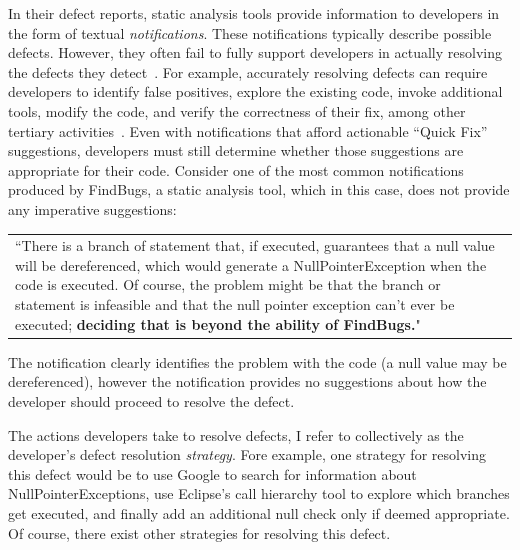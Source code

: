 \documentclass{sig-alternate}
\begin{document}
In their defect reports, static analysis tools provide information to developers in the form of textual \textit{notifications}.
These notifications typically describe possible defects.
However, they often fail to fully support developers in actually resolving the defects they detect~\cite{Johnson2013}.
For example, accurately resolving defects can require developers to identify false positives, explore the existing code, invoke additional tools, modify the code, and verify the correctness of their fix, among other tertiary activities~\cite{Smith2015}.  
Even with notifications that afford actionable ``Quick Fix'' suggestions, developers must still determine whether those suggestions are appropriate for their code.
Consider one of the most common \cite{Ayewah2007} notifications produced by FindBugs, a static analysis tool, which in this case, does not provide any imperative suggestions:


\vspace{2mm}

\begin{tabular}{|p{7.5cm}}
	``There is a branch of statement that, if executed, guarantees that a null value will be dereferenced, which would generate a NullPointerException when the code is executed. Of course, the problem might be that the branch or statement is infeasible and that the null pointer exception can't ever be executed; \textbf{deciding that is beyond the ability of FindBugs.}"\\
\end{tabular}
\vspace{2mm}

The notification clearly identifies the problem with the code (a null value may be dereferenced), however the notification provides no suggestions about how the developer should proceed to resolve the defect. 

The actions developers take to resolve defects, I refer to collectively as the developer's defect resolution \textit{strategy}.
Fore example, one strategy for resolving this defect would be to use Google to search for information about NullPointerExceptions, use Eclipse's call hierarchy tool to explore which branches get executed, and finally add an additional null check only if deemed appropriate.
Of course, there exist other strategies for resolving this defect.
\end{document}
